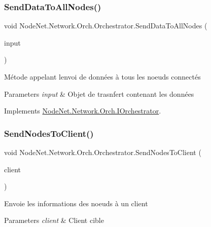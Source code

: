 \subsubsection{\texorpdfstring{Send\+Data\+To\+All\+Nodes()}{SendDataToAllNodes()}}
{\footnotesize\ttfamily void Node\+Net.\+Network.\+Orch.\+Orchestrator.\+Send\+Data\+To\+All\+Nodes (\begin{DoxyParamCaption}\item[{\hyperlink{class_node_net_1_1_data_1_1_data_input}{Data\+Input}}]{input }\end{DoxyParamCaption})}



Métode appelant l\textquotesingle{}envoi de données à tous les noeuds connectés 


\begin{DoxyParams}{Parameters}
{\em input} & Objet de trasnfert contenant les données\\
\hline
\end{DoxyParams}


Implements \hyperlink{interface_node_net_1_1_network_1_1_orch_1_1_i_orchestrator_affcb97b9f7365e03c5604a763f703ae2}{Node\+Net.\+Network.\+Orch.\+I\+Orchestrator}.

\mbox{\label{class_node_net_1_1_network_1_1_orch_1_1_orchestrator_a3b69251ec97470cdff773fc310cee138}} 
\subsubsection{\texorpdfstring{Send\+Nodes\+To\+Client()}{SendNodesToClient()}}
{\footnotesize\ttfamily void Node\+Net.\+Network.\+Orch.\+Orchestrator.\+Send\+Nodes\+To\+Client (\begin{DoxyParamCaption}\item[{\hyperlink{class_node_net_1_1_network_1_1_nodes_1_1_node}{Node}}]{client }\end{DoxyParamCaption})}



Envoie les informations des noeuds à un client 


\begin{DoxyParams}{Parameters}
{\em client} & Client cible\\
\hline
\end{DoxyParams}
\mbox{\label{class_node_net_1_1_network_1_1_orch_1_1_orchestrator_a70b4a3a4ba06b1b7225d0063fcaedec7}} 
